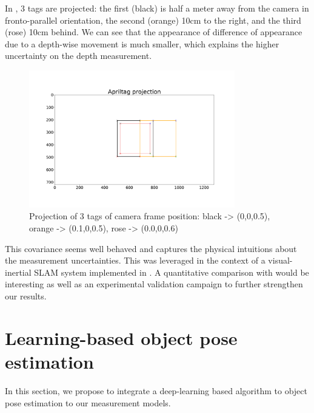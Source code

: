 In , 3 tags are projected: the first (black) is half a meter away from the camera in fronto-parallel orientation, the second (orange)
10cm to the right, and the third (rose) 10cm behind. We can see that the appearance of difference of appearance due to a depth-wise movement is much smaller, which 
explains the higher uncertainty on the depth measurement.

\begin{figure}[h]
    \centering
    \includegraphics[width=0.8\textwidth]{figures/apriltag_proj.pdf}
    \caption{Projection of 3 tags of camera frame position: black -> (0,0,0.5), orange -> (0.1,0,0.5), rose -> (0.0,0,0.6)}
    \label{fig:apriltag_proj}
\end{figure}

This covariance seems well behaved and captures the physical intuitions about the measurement uncertainties. 
This was leveraged in the context of a visual-inertial SLAM system implemented in . 
A quantitative comparison with \cite{urban2016mlpnp} would be interesting as well as an experimental validation campaign to further strengthen our results.


%
%
%
%
\section{Learning-based object pose estimation}
\label{sec:learning_based_object_pose_est}
In this section, we propose to integrate a deep-learning based algorithm to object pose estimation \cite{labbe2020cosypose} to our measurement models. 


